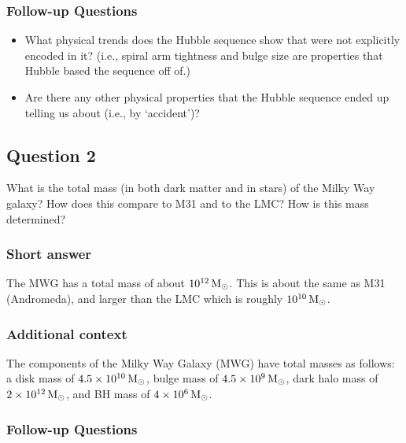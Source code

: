 \documentclass[a4paper,11pt]{article}
\begin{document}
\subsubsection{Follow-up Questions}

\begin{itemize}
    \item What physical trends does the Hubble sequence show that were not explicitly encoded in it? (i.e., spiral arm tightness and bulge size are properties that Hubble based the sequence off of.)
    \item Are there any other physical properties that the Hubble sequence ended up telling us about (i.e., by `accident')?
\end{itemize}



\newpage
\subsection{Question 2}

What is the total mass (in both dark matter and in stars) of the Milky Way galaxy? How does this compare to M31 and to the LMC? How is this mass determined?

\subsubsection{Short answer}

The MWG has a total mass of about $10^{12}\,{\rm M_\odot}$. This is about the same as M31 (Andromeda), and larger than the LMC which is roughly $10^{10}\,{\rm M_\odot}$.

\subsubsection{Additional context}

The components of the Milky Way Galaxy (MWG) have total masses as follows: a disk mass of $4.5\times10^{10}\,{\rm M_\odot}$, bulge mass of $4.5\times10^9\,{\rm M_\odot}$, dark halo mass of $2\times10^{12}\,{\rm M_\odot}$, and BH mass of $4\times10^6\,{\rm M_\odot}$.

\subsubsection{Follow-up Questions}
\end{document}
